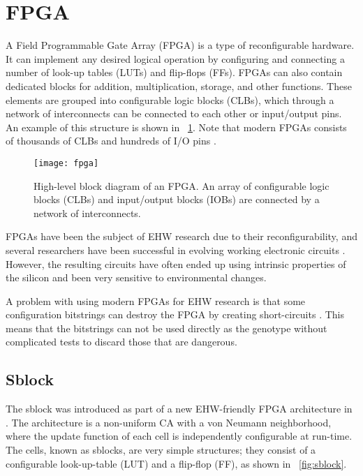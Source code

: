 \section{FPGA}

A Field Programmable Gate Array (FPGA) is a type of reconfigurable hardware.
It can implement any desired logical operation by configuring and connecting a number of look-up tables (LUTs) and flip-flops (FFs).
FPGAs can also contain dedicated blocks for addition, multiplication, storage, and other functions.
These elements are grouped into configurable logic blocks (CLBs), which through a network of interconnects can be connected to each other or input/output pins.
An example of this structure is shown in \figurename~\ref{fig:fpga}.
Note that modern FPGAs consists of thousands of CLBs and hundreds of I/O pins \cite{ds160}.

\begin{figure}[!ht]
    \centering
    \texttt{[image: fpga]}
    \caption[FPGA]{
        High-level block diagram of an FPGA.
        An array of configurable logic blocks (CLBs) and input/output blocks (IOBs) are connected by a network of interconnects.
    }
    \label{fig:fpga}
\end{figure}

FPGAs have been the subject of EHW research due to their reconfigurability, and several researchers have been successful in evolving working electronic circuits \cite{huelsbergen1998evolution} \cite{thompson1997evolved}.
However, the resulting circuits have often ended up using intrinsic properties of the silicon and been very sensitive to environmental changes.

A problem with using modern FPGAs for EHW research is that some configuration bitstrings can destroy the FPGA by creating short-circuits \cite{ug380} \cite{xapp151}.
This means that the bitstrings can not be used directly as the genotype without complicated tests to discard those that are dangerous.

\subsection{Sblock}

The sblock was introduced as part of a new EHW-friendly FPGA architecture in \cite{haddow2000sblock}.
The architecture is a non-uniform CA with a von Neumann neighborhood, where the update function of each cell is independently configurable at run-time.
The cells, known as sblocks, are very simple structures; they consist of a configurable look-up-table (LUT) and a flip-flop (FF), as shown in \figurename~\ref{fig:sblock}.

